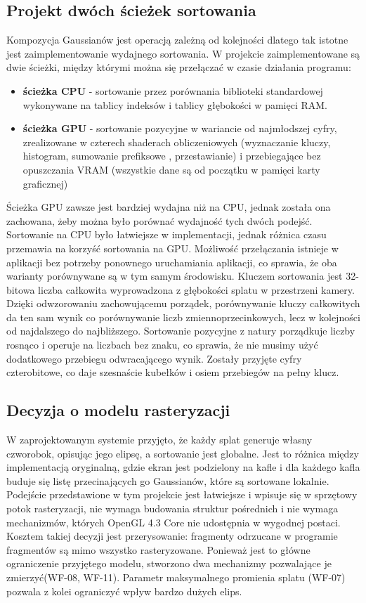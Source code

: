 \subsection{Projekt dwóch ścieżek sortowania}
\label{subsec:sortowanie}
Kompozycja Gaussianów jest operacją zależną od kolejności dlatego tak istotne jest zaimplementowanie wydajnego sortowania. W projekcie zaimplementowane są dwie ścieżki, między którymi można się przełączać w czasie działania programu:
\begin{itemize}
    \item \textbf{ścieżka CPU} - sortowanie przez porównania biblioteki standardowej wykonywane na tablicy indeksów i tablicy głębokości w pamięci RAM.
    \item \textbf{ścieżka GPU} - sortowanie pozycyjne  w wariancie od najmłodszej cyfry, zrealizowane w czterech shaderach obliczeniowych (wyznaczanie kluczy, histogram, sumowanie prefiksowe , przestawianie) i przebiegające bez opuszczania VRAM (wszystkie dane są od początku w pamięci karty graficznej)
\end{itemize}
Ścieżka GPU zawsze jest bardziej wydajna niż na CPU, jednak została ona zachowana, żeby można było porównać wydajność tych dwóch podejść. Sortowanie na CPU było łatwiejsze w implementacji, jednak różnica czasu przemawia na korzyść sortowania na GPU. Możliwość przełączania istnieje w aplikacji bez potrzeby ponownego uruchamiania aplikacji, co sprawia, że oba warianty porównywane są w tym samym środowisku.
Kluczem sortowania jest 32-bitowa liczba całkowita wyprowadzona z głębokości splatu w przestrzeni kamery. Dzięki odwzorowaniu zachowującemu porządek, porównywanie kluczy całkowitych da ten sam wynik co porównywanie liczb zmiennoprzecinkowych, lecz w kolejności od najdalszego do najbliższego. Sortowanie pozycyjne z natury porządkuje liczby rosnąco i operuje na liczbach bez znaku, co sprawia, że nie musimy użyć dodatkowego przebiegu odwracającego wynik. Zostały przyjęte cyfry czterobitowe, co daje szesnaście kubełków i osiem przebiegów na pełny klucz.
\subsection{Decyzja o modelu rasteryzacji}
\label{subsec:raster}
W zaprojektowanym systemie przyjęto, że każdy splat generuje własny czworobok, opisując jego elipsę, a sortowanie jest globalne. Jest to różnica między implementacją oryginalną, gdzie ekran jest podzielony na kafle i dla każdego kafla buduje się listę przecinających go Gaussianów, które są sortowane lokalnie. Podejście przedstawione w tym projekcie jest łatwiejsze i wpisuje się w sprzętowy potok rasteryzacji, nie wymaga budowania struktur pośrednich i nie wymaga mechanizmów, których OpenGL 4.3 Core nie udostępnia w wygodnej postaci.
Kosztem takiej decyzji jest przerysowanie: fragmenty odrzucane w programie fragmentów są mimo wszystko rasteryzowane. Ponieważ jest to główne ograniczenie przyjętego modelu, stworzono dwa mechanizmy pozwalające je zmierzyć(WF-08, WF-11). Parametr maksymalnego promienia splatu (WF-07) pozwala z kolei ograniczyć wpływ bardzo dużych elips.
